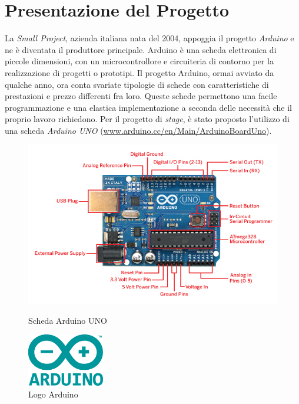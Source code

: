 \section{Presentazione del Progetto}

La \textit{Small Project}, azienda italiana nata del 2004, appoggia il progetto \textit{Arduino} e ne è diventata il produttore principale. Arduino è una scheda elettronica di piccole dimensioni, con un microcontrollore e circuiteria di contorno per la realizzazione di progetti o prototipi. Il progetto Arduino, ormai avviato da qualche anno, ora conta svariate tipologie di schede con caratteristiche di prestazioni e prezzo differenti fra loro. Queste schede permettono una facile programmazione e una elastica implementazione a seconda delle necessità che il proprio lavoro richiedono. Per il progetto di \textit{stage}, è stato proposto l'utilizzo di una scheda \textit{Arduino UNO} (\url{www.arduino.cc/en/Main/ArduinoBoardUno}).

\begin{figure}[htbp]
\centering
\begin{minipage}[c]{.60\textwidth}
	\centering\setlength{\captionmargin}{0pt}
	\includegraphics[scale=0.5]{./capitoli/capitolo2/img/ArduinoUNO}
	\caption{Scheda Arduino UNO}
\end{minipage}
\hspace{10mm}
\begin{minipage}[b]{.30\textwidth}
	\centering\setlength{\captionmargin}{0pt}%
	\includegraphics[width=0.30\textwidth]{./capitoli/capitolo2/img/arduinologo}
	\caption{Logo Arduino}
\end{minipage}%

\end{figure}  


